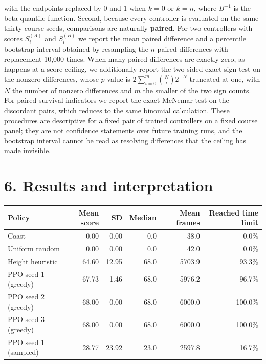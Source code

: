 \documentclass[
  11pt,
]{article}
\newcounter{none} %
\begin{document}
with the endpoints replaced by \(0\) and \(1\) when \(k=0\) or \(k=n\),
where \(B^{-1}\) is the beta quantile function. Second, because every
controller is evaluated on the same thirty course seeds, comparisons are
naturally \textbf{paired}. For two controllers with scores \(S^{(A)}_i\)
and \(S^{(B)}_i\) we report the mean paired difference and a percentile
bootstrap interval obtained by resampling the \(n\) paired differences
with replacement 10,000 times. When many paired differences are exactly
zero, as happens at a score ceiling, we additionally report the
two-sided exact sign test on the nonzero differences, whose \(p\)-value
is \(2\sum_{i=0}^{m}\binom{N}{i}2^{-N}\) truncated at one, with \(N\)
the number of nonzero differences and \(m\) the smaller of the two sign
counts. For paired survival indicators we report the exact McNemar test
on the discordant pairs, which reduces to the same binomial calculation.
These procedures are descriptive for a fixed pair of trained controllers
on a fixed course panel; they are not confidence statements over future
training runs, and the bootstrap interval cannot be read as resolving
differences that the ceiling has made invisible.

\section{6. Results and
interpretation}\label{results-and-interpretation}

{\def\LTcaptype{none} %
\begin{longtable}[]{@{}lrrrrr@{}}
\toprule\noalign{}
Policy & Mean score & SD & Median & Mean frames & Reached time limit \\
\midrule\noalign{}
\endhead
\bottomrule\noalign{}
\endlastfoot
Coast & 0.00 & 0.00 & 0.0 & 38.0 & 0.0\% \\
Uniform random & 0.00 & 0.00 & 0.0 & 42.0 & 0.0\% \\
Height heuristic & 64.60 & 12.95 & 68.0 & 5703.9 & 93.3\% \\
PPO seed 1 (greedy) & 67.73 & 1.46 & 68.0 & 5976.2 & 96.7\% \\
PPO seed 2 (greedy) & 68.00 & 0.00 & 68.0 & 6000.0 & 100.0\% \\
PPO seed 3 (greedy) & 68.00 & 0.00 & 68.0 & 6000.0 & 100.0\% \\
PPO seed 1 (sampled) & 28.77 & 23.92 & 23.0 & 2597.8 & 16.7\% \\
\end{longtable}
}
\end{document}
